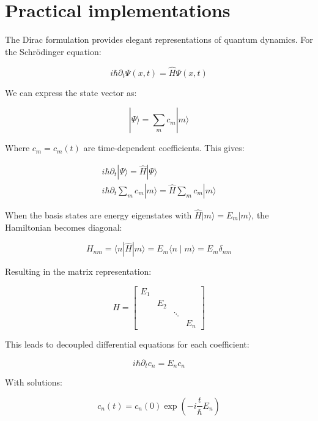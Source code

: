 \section{Practical implementations}
The Dirac formulation provides elegant representations of quantum dynamics. For the Schrödinger equation:

\begin{equation}
i \hbar \partial_{t} \Psi(x, t)=\hat{H} \Psi(x, t)
\end{equation}

We can express the state vector as:

\begin{equation}
|\Psi\rangle=\sum_{m} c_{m}|m\rangle
\end{equation}

Where $c_{m}=c_{m}(t)$ are time-dependent coefficients. This gives:

\[
\begin{array}{r}
i \hbar \partial_{t}|\Psi\rangle=\hat{H}|\Psi\rangle \\
i \hbar \partial_{t} \sum_{m} c_{m}|m\rangle=\hat{H} \sum_{m} c_{m}|m\rangle
\end{array}
\]

When the basis states are energy eigenstates with $\hat{H}|m\rangle=E_{m}|m\rangle$, the Hamiltonian becomes diagonal:

\begin{equation}
H_{n m}=\langle n| \hat{H}|m\rangle=E_{m}\langle n \mid m\rangle=E_{m} \delta_{n m}
\end{equation}

Resulting in the matrix representation:

\[
H=\left[\begin{array}{llll}
E_{1} & & &  \\
& E_{2} & & \\
& & \ddots & \\
& & & E_{n}
\end{array}\right]
\]

This leads to decoupled differential equations for each coefficient:

\begin{equation}
i \hbar \partial_{t} c_{n}=E_{n} c_{n}
\end{equation}

With solutions:

\begin{equation}
c_{n}(t)=c_{n}(0) \exp \left(-i \frac{t}{\hbar} E_{n}\right)
\end{equation}


